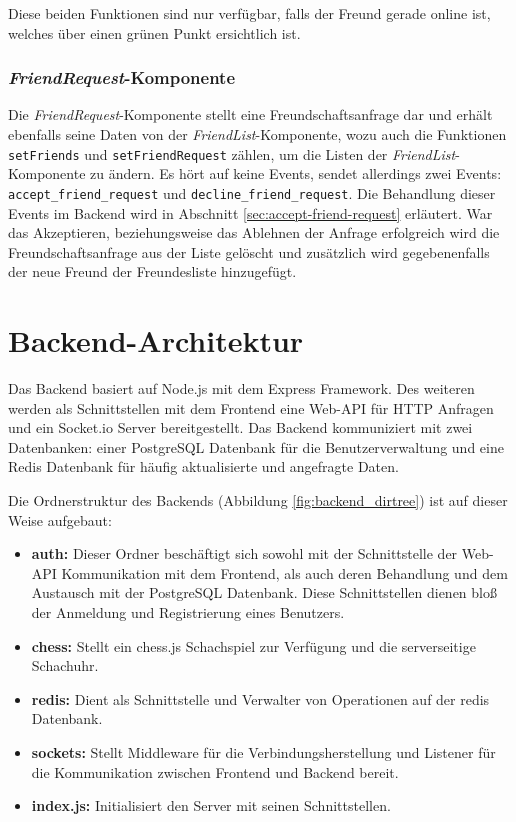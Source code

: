 Diese beiden Funktionen sind nur verfügbar, falls der Freund gerade online ist, welches über einen grünen Punkt ersichtlich ist. 

\subsubsection{\textit{FriendRequest}-Komponente}
Die \textit{FriendRequest}-Komponente stellt eine Freundschaftsanfrage dar und erhält ebenfalls seine Daten von der \textit{FriendList}-Komponente, wozu auch die Funktionen \verb|setFriends| und \verb|setFriendRequest| zählen, um die Listen der \textit{FriendList}-Komponente zu ändern.
Es hört auf keine Events, sendet allerdings zwei Events: \verb|accept_friend_request| und \verb|decline_friend_request|. Die Behandlung dieser Events im Backend wird in Abschnitt \ref{sec:accept-friend-request} erläutert. War das Akzeptieren, beziehungsweise das Ablehnen der Anfrage erfolgreich wird die Freundschaftsanfrage aus der Liste gelöscht und zusätzlich wird gegebenenfalls der neue Freund der Freundesliste hinzugefügt.


        \section{Backend-Architektur}
Das Backend basiert auf Node.js mit dem Express Framework. Des weiteren werden als Schnittstellen mit dem Frontend eine Web-API für HTTP Anfragen und ein Socket.io Server bereitgestellt. Das Backend kommuniziert mit zwei Datenbanken: einer PostgreSQL Datenbank für die Benutzerverwaltung und eine Redis Datenbank für häufig aktualisierte und angefragte Daten.

Die Ordnerstruktur des Backends (Abbildung \ref{fig:backend_dirtree}) ist auf dieser Weise aufgebaut:

\begin{itemize}
\item \textbf{auth:} Dieser Ordner beschäftigt sich sowohl mit der Schnittstelle der Web-API Kommunikation mit dem Frontend, als auch deren Behandlung und dem Austausch mit der PostgreSQL Datenbank. Diese Schnittstellen dienen bloß der Anmeldung und Registrierung eines Benutzers.
\item \textbf{chess:} Stellt ein chess.js Schachspiel zur Verfügung und die serverseitige Schachuhr.
\item \textbf{redis:} Dient als Schnittstelle und Verwalter von Operationen auf der redis Datenbank.
\item \textbf{sockets:} Stellt Middleware für die Verbindungsherstellung und Listener für die Kommunikation zwischen Frontend und Backend bereit.
\item \textbf{index.js:} Initialisiert den Server mit seinen Schnittstellen.
\end{itemize}

